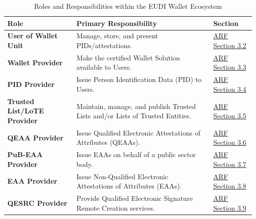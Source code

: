 \documentclass[binding=0.6cm,oneside,noexaminfo]{sapthesis}
\begin{document}
\begin{table}[htbp]
    \centering
    \caption{Roles and Responsibilities within the EUDI Wallet Ecosystem}
    \label{tab:roles}
    \small
    \begin{tabularx}{\textwidth}{@{}l L l@{}}
        \toprule
        \textbf{Role} & \textbf{Primary Responsibility} & \textbf{Section} \\
        \midrule
        \textbf{User of Wallet Unit} & Manage, store, and present PIDs/attestations. & \href{https://eudi.dev/latest/architecture-and-reference-framework-main/\#32-users-of-wallet-units}{ARF Section 3.2} \\
        \textbf{Wallet Provider} & Make the certified Wallet Solution available to Users. & \href{https://eudi.dev/latest/architecture-and-reference-framework-main/\#33-wallet-providers}{ARF Section 3.3} \\
        \textbf{PID Provider} & Issue Person Identification Data (PID) to Users. & \href{https://eudi.dev/latest/architecture-and-reference-framework-main/\#34-person-identification-data-pid-providers}{ARF Section 3.4} \\
        \textbf{Trusted List/LoTE Provider} & Maintain, manage, and publish Trusted Lists and/or Lists of Trusted Entities. & \href{https://eudi.dev/latest/architecture-and-reference-framework-main/\#35-trusted-list-or-lote-provider}{ARF Section 3.5} \\
        \textbf{QEAA Provider} & Issue Qualified Electronic Attestations of Attributes (QEAAs). & \href{https://eudi.dev/latest/architecture-and-reference-framework-main/\#36-qualified-electronic-attestation-of-attributes-qeaa-providers}{ARF Section 3.6} \\
        \textbf{PuB-EAA Provider} & Issue EAAs on behalf of a public sector body. & \href{https://eudi.dev/latest/architecture-and-reference-framework-main/\#37-eaa-issued-by-or-on-behalf-of-a-public-sector-body-responsible-for-an-authentic-source-pub-eaa-providers}{ARF Section 3.7} \\
        \textbf{EAA Provider} & Issue Non-Qualified Electronic Attestations of Attributes (EAAs). & \href{https://eudi.dev/latest/architecture-and-reference-framework-main/\#38-non-qualified-electronic-attestation-of-attributes-eaa-providers}{ARF Section 3.8} \\
        \textbf{QESRC Provider} & Provide Qualified Electronic Signature Remote Creation services. & \href{https://eudi.dev/latest/architecture-and-reference-framework-main/\#39-qualified-electronic-signature-remote-creation-qesrc-providers}{ARF Section 3.9} \\

\end{tabularx}
\end{table}
\end{document}
